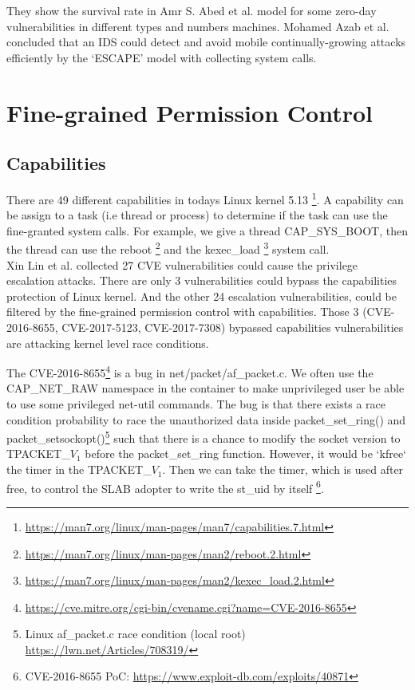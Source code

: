 They show the survival rate in Amr S. Abed et al.\cite{inproceedings} model for some
zero-day vulnerabilities in different types and numbers machines. Mohamed Azab et al.
\cite{7809699,7796855} concluded that an IDS could detect and avoid mobile continually-growing
attacks efficiently by the `ESCAPE' model with collecting system calls.\\

\section{Fine-grained Permission Control}
\subsection{Capabilities}

There are 49 different capabilities in todays Linux kernel 5.13
\footnote{\url{https://man7.org/linux/man-pages/man7/capabilities.7.html}}. A capability can be
assign to a task (i.e thread or process) to determine if the task can use the fine-granted
system calls. For example, we give a thread CAP\_SYS\_BOOT, then the thread can use the
reboot \footnote{\url{https://man7.org/linux/man-pages/man2/reboot.2.html}} and the
kexec\_load \footnote{\url{https://man7.org/linux/man-pages/man2/kexec\_load.2.html}} system call.\\

Xin Lin et al.\cite{10.1145/3274694.3274720} collected 27 CVE vulnerabilities could cause
the privilege escalation attacks. There are only 3 vulnerabilities could bypass the
capabilities protection of Linux kernel. And the other 24 escalation vulnerabilities, could
be filtered by the fine-grained permission control with capabilities. Those 3 (CVE-2016-8655,
CVE-2017-5123, CVE-2017-7308) bypassed capabilities vulnerabilities are attacking kernel level
race conditions.

The CVE-2016-8655\footnote{\url{https://cve.mitre.org/cgi-bin/cvename.cgi?name=CVE-2016-8655}}
is a bug in net/packet/af\_packet.c. We often use the CAP\_NET\_RAW namespace in the container
to make unprivileged user be able to use some privileged net-util commands. The bug is that
there exists a race condition probability to race the unauthorized data inside packet\_set\_ring()
and packet\_setsockopt()\footnote{Linux af\_packet.c race condition (local root) \url{https://lwn.net/Articles/708319/}}
such that  there is a chance to modify the socket version to TPACKET\_$V_1$ before the
packet\_set\_ring function. However, it would be ‘kfree‘ the timer in the TPACKET\_$V_1$.
Then we can take the timer, which  is used after free, to control the SLAB adopter to write
the st\_uid by itself \footnote{CVE-2016-8655 PoC: \url{https://www.exploit-db.com/exploits/40871}}.

